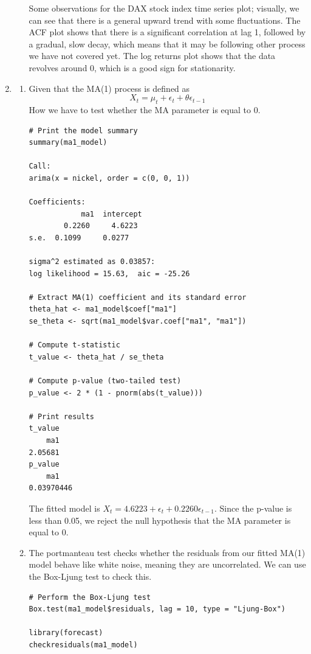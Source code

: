 \documentclass[12pt]{article}
\begin{document}
\begin{enumerate}
\begin{enumerate}
\begin{center}
    \end{center}
    Some observations for the DAX stock index time series plot; visually, we can see that
    there is a general upward trend with some fluctuations. The ACF plot shows that there is
    a significant correlation at lag 1, followed by a gradual, slow decay, which means that it
    may be following other process we have not covered yet. The log returns plot shows that 
    the data revolves around 0, which is a good sign for stationarity.
    \end{enumerate} 
    \item
    \begin{enumerate}
    \item Given that the MA(1) process is defined as
    \[
        X_t = \mu_t + \epsilon_t + \theta \epsilon_{t-1}
    \]
    How we have to test whether the MA parameter is equal 
    to 0.
\begin{verbatim}
# Print the model summary
summary(ma1_model)

Call:
arima(x = nickel, order = c(0, 0, 1))

Coefficients:
            ma1  intercept
        0.2260     4.6223
s.e.  0.1099     0.0277

sigma^2 estimated as 0.03857:  
log likelihood = 15.63,  aic = -25.26

# Extract MA(1) coefficient and its standard error
theta_hat <- ma1_model$coef["ma1"]
se_theta <- sqrt(ma1_model$var.coef["ma1", "ma1"])

# Compute t-statistic
t_value <- theta_hat / se_theta

# Compute p-value (two-tailed test)
p_value <- 2 * (1 - pnorm(abs(t_value)))

# Print results
t_value
    ma1 
2.05681 
p_value
    ma1 
0.03970446
\end{verbatim}
    The fitted model is $X_t = 4.6223 + \epsilon_t + 0.2260 \epsilon_{t-1}$.
    Since the p-value is less than 0.05, we reject the null hypothesis that the MA parameter is equal to 0.
    
    \item The portmanteau test checks whether the residuals
    from our fitted MA(1) model behave like white noise, meaning they are uncorrelated.
    We can use the Box-Ljung test to check this.
\begin{verbatim}
# Perform the Box-Ljung test
Box.test(ma1_model$residuals, lag = 10, type = "Ljung-Box")

library(forecast)
checkresiduals(ma1_model)


\end{verbatim}
\end{enumerate}
\end{enumerate}
\end{document}
